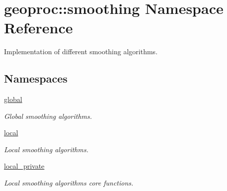 \hypertarget{namespacegeoproc_1_1smoothing}{}\section{geoproc\+:\+:smoothing Namespace Reference}
\label{namespacegeoproc_1_1smoothing}


Implementation of different smoothing algorithms.  


\subsection*{Namespaces}
\begin{DoxyCompactItemize}
\item 
 \hyperlink{namespacegeoproc_1_1smoothing_1_1global}{global}
\begin{DoxyCompactList}\small\item\em Global smoothing algorithms. \end{DoxyCompactList}\item 
 \hyperlink{namespacegeoproc_1_1smoothing_1_1local}{local}
\begin{DoxyCompactList}\small\item\em Local smoothing algorithms. \end{DoxyCompactList}\item 
 \hyperlink{namespacegeoproc_1_1smoothing_1_1local__private}{local\+\_\+private}
\begin{DoxyCompactList}\small\item\em Local smoothing algorithms core functions. \end{DoxyCompactList}\end{DoxyCompactItemize}
